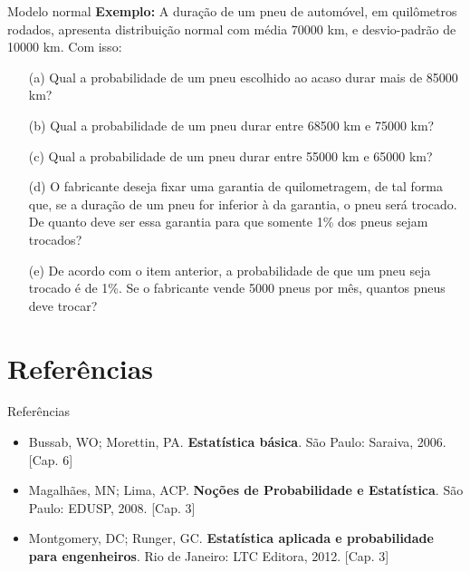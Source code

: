 \documentclass[10pt]{beamer}\usepackage[]{graphicx}\usepackage[]{color}
\theoremstyle{definition}
\begin{document}
\begin{frame}[fragile]{Modelo normal}
  \textbf{Exemplo:} A duração de um pneu de automóvel, em quilômetros
  rodados, apresenta distribuição normal com média 70000 km, e
  desvio-padrão de 10000 km. Com isso:
  \begin{itemize}
  \item[(a)] Qual a probabilidade de um pneu escolhido ao acaso durar mais de
    85000 km?
  \item[(b)] Qual a probabilidade de um pneu durar entre 68500 km e 75000 km?
  \item[(c)] Qual a probabilidade de um pneu durar entre 55000 km e 65000 km?
  \item[(d)] O fabricante deseja fixar uma garantia de quilometragem, de tal
    forma que, se a duração de um pneu for inferior à da garantia, o
    pneu será trocado. De quanto deve ser essa garantia para que somente
    1\% dos pneus sejam trocados?
  \item[(e)] De acordo com o item anterior, a probabilidade de que um pneu
    seja trocado é de 1\%. Se o fabricante vende 5000 pneus por mês,
    quantos pneus deve trocar?
  \end{itemize}
\end{frame}



\section{Referências}

\begin{frame}{Referências}
  \begin{itemize}
  \item Bussab, WO; Morettin, PA. \textbf{Estatística básica}. São
    Paulo: Saraiva, 2006. [Cap. 6]
  \item Magalhães, MN; Lima, ACP. \textbf{Noções de Probabilidade e
      Estatística}. São Paulo: EDUSP, 2008. [Cap. 3]
  \item Montgomery, DC; Runger, GC. \textbf{Estatística aplicada e
      probabilidade para engenheiros}. Rio de Janeiro: LTC Editora,
    2012. [Cap. 3]
  \end{itemize}
\end{frame}
\end{document}
